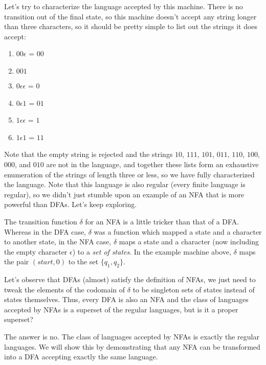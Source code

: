 \documentclass[twoside]{article}
\begin{document}
Let's try to characterize the language accepted by this machine.  There is no transition out of the final state, so this machine doesn't accept any string longer than three characters, so it should be pretty simple to list out the strings it does accept:
\begin{enumerate}
	\item[] $00\epsilon$ = $00$
	\item[] $001$
	\item[] $0\epsilon\epsilon$ = $0$
	\item[] $0\epsilon 1$ = $01$
	\item[] $1\epsilon\epsilon$ = $1$
	\item[] $1\epsilon 1$ = $11$
\end{enumerate}

Note that the empty string is rejected and the strings $10$, $111$, $101$, $011$, $110$, $100$, $000$, and $010$ are not in the language, and together these lists form an exhaustive enumeration of the strings of length three or less, so we have fully characterized the language.  Note that this language is also regular (every finite language is regular), so we didn't just stumble upon an example of an NFA that is more powerful than DFAs.  Let's keep exploring.


The transition function $\delta$ for an NFA is a little tricker than that of a DFA.  Whereas in the DFA case, $\delta$ was a function which mapped a state and a character to another state, in the NFA case, $\delta$ maps a state and a character (now including the empty character $\epsilon$) to a \textit{set of states}.  In the example machine above, $\delta$ maps the pair $(start,0)$ to the set $\{q_1,q_2\}$.

Let's observe that DFAs (almost) satisfy the definition of NFAs, we just need to tweak the elements of the codomain of $\delta$ to be singleton sets of states instead of states themselves.  Thus, every DFA is also an NFA and the class of languages accepted by NFAs is a superset of the regular languages, but is it a proper superset?

The answer is no.  The class of languages accepted by NFAs is exactly the regular languages.  We will show this by demonstrating that any NFA can be transformed into a DFA accepting exactly the same language.
\end{document}
